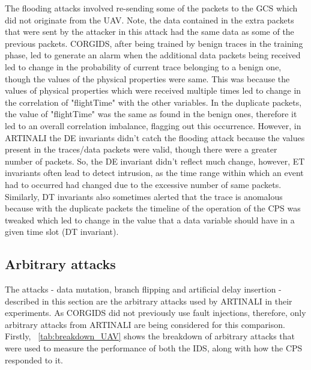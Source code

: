 The flooding attacks involved re-sending some of the packets to the \ac{GCS} which did not originate from the \ac{UAV}. Note, the data contained in the extra packets that were sent by the attacker in this attack had the same data as some of the previous packets. \ac{CORGIDS}, after being trained by benign traces in the training phase, led to generate an alarm when the additional data packets being received led to change in the probability of current trace belonging to a benign one, though the values of the physical properties were same. This was because the values of physical properties which were received multiple times led to change in the correlation of "flightTime" with the other variables. In the duplicate packets, the value of "flightTime" was the same as found in the benign ones, therefore it led to an overall correlation imbalance, flagging out this occurrence. However, in ARTINALI the D\textbar E invariants didn't catch the flooding attack because the values present in the traces/data packets were valid, though there were a greater number of packets. So, the D\textbar E invariant didn't reflect much change, however, E\textbar T invariants often lead to detect intrusion, as the time range within which an event had to occurred had changed due to the excessive number of same packets. Similarly, D\textbar T invariants also sometimes alerted that the trace is anomalous because with the duplicate packets the timeline of the operation of the \ac{CPS} was tweaked which led to change in the value that a data variable should have in a given time slot (D\textbar T invariant).

\subsection{Arbitrary attacks}
The attacks - data mutation, branch flipping and artificial delay insertion - described in this section are the arbitrary attacks used by ARTINALI in their experiments. As \ac{CORGIDS} did not previously use fault injections, therefore, only arbitrary attacks from ARTINALI are being considered for this comparison.
Firstly, ~\autoref{tab:breakdown_UAV} shows the breakdown of arbitrary attacks that were used to measure the performance of both the \ac{IDS}, along with how the \ac{CPS} responded to it.

\begin{table}
\centering
  \caption{Breakdown of arbitrary attacks for \ac{UAV} platform}
  \label{tab:breakdown_UAV}
\end{table}

